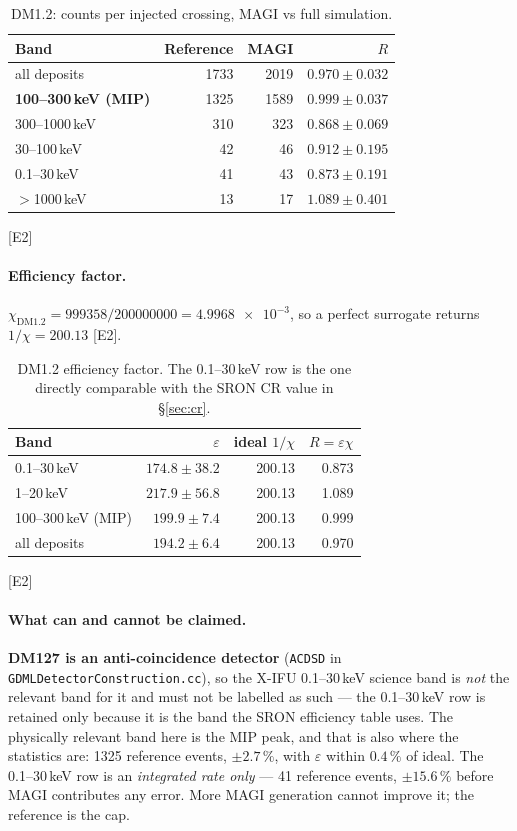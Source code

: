 \documentclass[11pt,a4paper]{article}
\newcommand{\ev}[1]{{\footnotesize\textcolor{prov}{[#1]}}}
\begin{document}
\begin{table}[h]
\centering
\caption{DM1.2: counts per injected crossing, MAGI vs full simulation.}
\begin{tabular}{lrrr}
\toprule
Band & Reference & MAGI & $R$ \\
\midrule
all deposits            & \num{1733} & \num{2019} & $0.970 \pm 0.032$ \\
\textbf{100--300\,keV (MIP)} & \num{1325} & \num{1589} & $\mathbf{0.999 \pm 0.037}$ \\
300--1000\,keV          & 310  & 323  & $0.868 \pm 0.069$ \\
30--100\,keV            & 42   & 46   & $0.912 \pm 0.195$ \\
0.1--30\,keV            & 41   & 43   & $0.873 \pm 0.191$ \\
$>$1000\,keV            & 13   & 17   & $1.089 \pm 0.401$ \\
\bottomrule
\end{tabular}
\ev{E2}
\end{table}

\paragraph{Efficiency factor.}
$\chi_{\mathrm{DM1.2}} = \num{999358}/\num{200000000} = \num{4.9968e-3}$, so a
perfect surrogate returns $1/\chi = 200.13$ \ev{E2}.

\begin{table}[h]
\centering
\caption{DM1.2 efficiency factor. The 0.1--30\,keV row is the one directly
comparable with the SRON CR value in \S\ref{sec:cr}.}
\begin{tabular}{lrrr}
\toprule
Band & $\varepsilon$ & ideal $1/\chi$ & $R = \varepsilon\chi$ \\
\midrule
0.1--30\,keV          & $174.8 \pm 38.2$ & 200.13 & 0.873 \\
1--20\,keV            & $217.9 \pm 56.8$ & 200.13 & 1.089 \\
100--300\,keV (MIP)   & $199.9 \pm 7.4$  & 200.13 & 0.999 \\
all deposits          & $194.2 \pm 6.4$  & 200.13 & 0.970 \\
\bottomrule
\end{tabular}
\ev{E2}
\end{table}

\paragraph{What can and cannot be claimed.}
\textbf{DM127 is an anti-coincidence detector} (\texttt{ACDSD} in
\texttt{GDMLDetectorConstruction.cc}), so the X-IFU 0.1--30\,keV science band is
\emph{not} the relevant band for it and must not be labelled as such --- the
0.1--30\,keV row is retained only because it is the band the SRON efficiency
table uses. The physically relevant band here is the MIP peak, and that is also
where the statistics are: \num{1325} reference events, $\pm2.7\,\%$, with
$\varepsilon$ within $0.4\,\%$ of ideal. The 0.1--30\,keV row is an
\emph{integrated rate only} --- 41 reference events, $\pm15.6\,\%$ before MAGI
contributes any error. More MAGI generation cannot improve it; the reference is
the cap.
\end{document}
